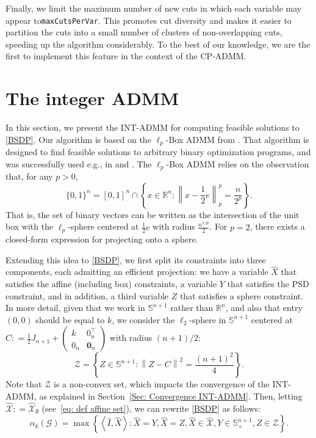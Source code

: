 \documentclass[11pt, a4paper]{article}
\newcommand{\IP}[2]{\left\langle #1, #2 \right\rangle}
\newcommand{\eqdef}{\mathrel{\mathop:}=}
\newcommand\norm[1]{\left\lVert#1\right\rVert}
\newcommand{\mc}{\mathcal}
\newcommand{\aug}[1]{\hat{#1}}
\begin{document}
Finally, we limit the maximum number of new cuts in which each variable may appear to\linebreak \texttt{maxCutsPerVar}. This promotes cut diversity and makes it easier to partition the cuts into a small number of clusters of non-overlapping cuts, speeding up the algorithm considerably. To the best of our knowledge, we are the first to implement this feature in the context of the CP-ADMM.

\section{The integer ADMM} \label{Sec: INT-ADMM}
In this section, we present the INT-ADMM for computing feasible solutions to \eqref{BSDP}. Our algorithm is based on the $\ell_p$-Box ADMM from \cite{Wu2019LpBoxADMM}. 
That algorithm is designed to find feasible solutions to arbitrary binary optimization programs, and was successfully used e.g., in \cite{Jiao2021PenalizedLpBox} and \cite{Wu2018LpBoxUsage}.
The $\ell_p$-Box ADMM relies on the observation that, for any $p > 0$,
\begin{equation}
    \{0,1\}^n = [0,1]^n \cap \left\{x \in \mathbb{R}^n: \norm{x - \frac{1}{2}e}_p^p = \frac{n}{2^p}\right\}. \label{integer = box union sphere}
\end{equation}
That is, the set of binary vectors can be written as the intersection of the unit box with the $\ell_p$-sphere centered at $\frac{1}{2}e$ with radius $\frac{n^{1/p}}{2}$. 
For $p=2$, there exists a closed-form expression for projecting onto a sphere.

Extending this idea to \eqref{BSDP}, we first split its constraints into three components, each admitting an efficient projection: we have a variable $\aug{X}$ that satisfies the affine (including box) constraints, a variable $Y$ that satisfies the PSD constraint, and in addition, a third variable $Z$ that satisfies a sphere constraint.
In more detail, given that we work in $\mathbb{S}^{n+1}$ rather than $\mathbb{R}^n$, and also that entry $(0,0)$ should be equal to $k$, we consider the $\ell_2$-sphere in $\mathbb{S}^{n+1}$ centered at $C \eqdef \frac{1}{2}J_{n+1} + \begin{pmatrix} k & 0_n^\top \\ 0_n & \textbf{0}_n \end{pmatrix}$ with radius $(n+1)/2$:
\begin{equation}
    \mc{Z} = \left\{Z \in \mathbb{S}^{n+1} : \norm{Z - C}^2 = \frac{(n+1)^2}{4}\right\}.
\end{equation}
Note that $\mc{Z}$ is a non-convex set, which impacts the convergence of the INT-ADMM, as explained in Section~\ref{Sec: Convergence INT-ADMM}.
Then, letting $\aug{\mc{X}} \eqdef \aug{\mc{X}}_\emptyset$ (see~\eqref{eq: def affine set}), we can rewrite \eqref{BSDP} as follows:
\begin{equation}
    \alpha_k(\mc{G}) = \max \left\{\IP{\aug{I}}{\aug{X}}: \aug{X}=Y, \aug{X} = Z, \aug{X} \in \aug{\mc{X}}, Y \in \mathbb{S}_+^{n+1}, Z \in \mc{Z}\right\}. \label{INT-ADMM split}
\end{equation}
\end{document}
